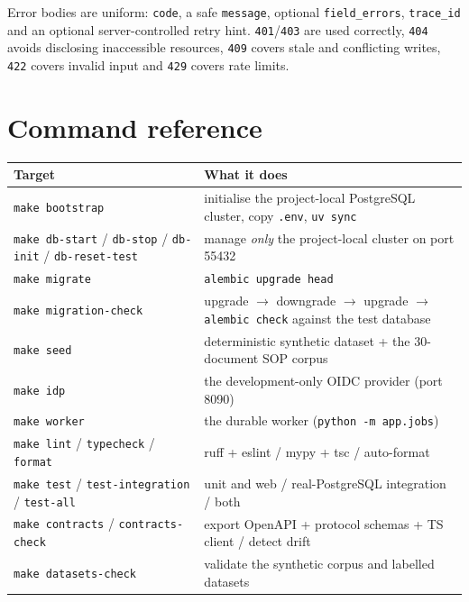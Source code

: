 \documentclass[11pt,a4paper]{article}
\begin{document}
Error bodies are uniform: \texttt{code}, a safe \texttt{message}, optional
\texttt{field\_errors}, \texttt{trace\_id} and an optional server-controlled
retry hint. \texttt{401}/\texttt{403} are used correctly, \texttt{404} avoids
disclosing inaccessible resources, \texttt{409} covers stale and conflicting
writes, \texttt{422} covers invalid input and \texttt{429} covers rate limits.

\clearpage
\section{Command reference}

\begin{table}[h]
\centering\small
\begin{tabularx}{\linewidth}{@{}L{3.6cm}Y@{}}
\toprule
\textbf{Target} & \textbf{What it does}\\
\midrule
\texttt{make bootstrap} & initialise the project-local PostgreSQL cluster, copy \texttt{.env}, \texttt{uv sync}\\
\texttt{make db-start} / \texttt{db-stop} / \texttt{db-init} / \texttt{db-reset-test} & manage \emph{only} the project-local cluster on port 55432\\
\texttt{make migrate} & \texttt{alembic upgrade head}\\
\texttt{make migration-check} & upgrade $\rightarrow$ downgrade $\rightarrow$ upgrade $\rightarrow$ \texttt{alembic check} against the test database\\
\texttt{make seed} & deterministic synthetic dataset + the 30-document SOP corpus\\
\texttt{make idp} & the development-only OIDC provider (port 8090)\\
\texttt{make worker} & the durable worker (\texttt{python -m app.jobs})\\
\texttt{make lint} / \texttt{typecheck} / \texttt{format} & ruff + eslint / mypy + tsc / auto-format\\
\texttt{make test} / \texttt{test-integration} / \texttt{test-all} & unit and web / real-PostgreSQL integration / both\\
\texttt{make contracts} / \texttt{contracts-check} & export OpenAPI + protocol schemas + TS client / detect drift\\
\texttt{make datasets-check} & validate the synthetic corpus and labelled datasets\\

\end{tabularx}
\end{table}
\end{document}
